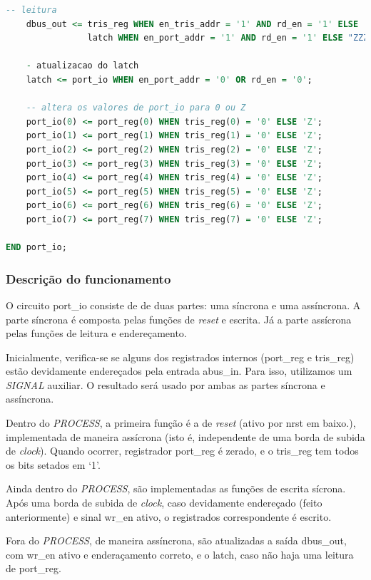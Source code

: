 \documentclass{article}
\begin{document}
\begin{lstlisting}[language=VHDL, caption={Código VHDL w\_reg}]
    -- leitura
    dbus_out <= tris_reg WHEN en_tris_addr = '1' AND rd_en = '1' ELSE 
                latch WHEN en_port_addr = '1' AND rd_en = '1' ELSE "ZZZZZZZZ";

    - atualizacao do latch
    latch <= port_io WHEN en_port_addr = '0' OR rd_en = '0';

    -- altera os valores de port_io para 0 ou Z
    port_io(0) <= port_reg(0) WHEN tris_reg(0) = '0' ELSE 'Z';
    port_io(1) <= port_reg(1) WHEN tris_reg(1) = '0' ELSE 'Z';
    port_io(2) <= port_reg(2) WHEN tris_reg(2) = '0' ELSE 'Z';
    port_io(3) <= port_reg(3) WHEN tris_reg(3) = '0' ELSE 'Z';
    port_io(4) <= port_reg(4) WHEN tris_reg(4) = '0' ELSE 'Z';
    port_io(5) <= port_reg(5) WHEN tris_reg(5) = '0' ELSE 'Z';
    port_io(6) <= port_reg(6) WHEN tris_reg(6) = '0' ELSE 'Z';
    port_io(7) <= port_reg(7) WHEN tris_reg(7) = '0' ELSE 'Z';

END port_io;
\end{lstlisting}

\subsubsection{Descrição do funcionamento}

O circuito port\_io consiste de de duas partes: uma síncrona e uma assíncrona. A parte síncrona é composta pelas funções de \textit{reset} e escrita. Já a parte assícrona pelas funções de leitura e endereçamento.

Inicialmente, verifica-se se alguns dos registrados internos (port\_reg e tris\_reg) estão devidamente endereçados pela entrada abus\_in. Para isso, utilizamos um \textit{SIGNAL} auxiliar. O resultado será usado por ambas as partes síncrona e assíncrona.

Dentro do \textit{PROCESS}, a primeira função é a de \textit{reset} (ativo por nrst em baixo.), implementada de maneira assícrona (isto é, independente de uma borda de subida de \textit{clock}). Quando ocorrer, registrador port\_reg é zerado, e o tris\_reg tem todos os bits setados em `1'.

Ainda dentro do \textit{PROCESS}, são implementadas as funções de escrita sícrona. Após uma borda de subida de \textit{clock}, caso devidamente endereçado (feito anteriormente) e sinal wr\_en ativo, o registrados correspondente é escrito.

Fora do \textit{PROCESS}, de maneira assíncrona, são atualizadas a saída dbus\_out, com wr\_en ativo e enderaçamento correto, e o latch, caso não haja uma leitura de port\_reg.
\end{document}
